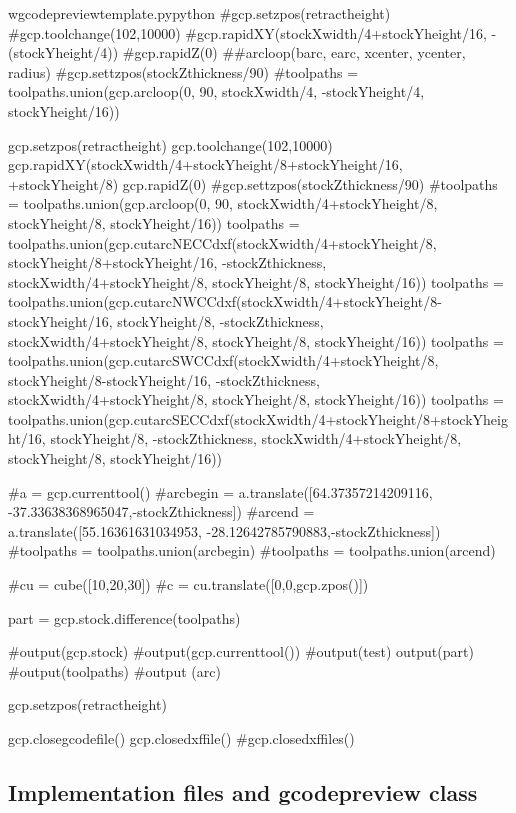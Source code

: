 \documentclass{ltxdoc}
\begin{document}
\begin{writecode}{w}{gcodepreviewtemplate.py}{python}
#gcp.setzpos(retractheight)
#gcp.toolchange(102,10000)
#gcp.rapidXY(stockXwidth/4+stockYheight/16, -(stockYheight/4))
#gcp.rapidZ(0)
##arcloop(barc, earc, xcenter, ycenter, radius)
#gcp.settzpos(stockZthickness/90)
#toolpaths = toolpaths.union(gcp.arcloop(0, 90, stockXwidth/4, -stockYheight/4, stockYheight/16))

gcp.setzpos(retractheight)
gcp.toolchange(102,10000)
gcp.rapidXY(stockXwidth/4+stockYheight/8+stockYheight/16, +stockYheight/8)
gcp.rapidZ(0)
#gcp.settzpos(stockZthickness/90)
#toolpaths = toolpaths.union(gcp.arcloop(0, 90, stockXwidth/4+stockYheight/8, stockYheight/8, stockYheight/16))
toolpaths = toolpaths.union(gcp.cutarcNECCdxf(stockXwidth/4+stockYheight/8, stockYheight/8+stockYheight/16, -stockZthickness, stockXwidth/4+stockYheight/8, stockYheight/8, stockYheight/16))
toolpaths = toolpaths.union(gcp.cutarcNWCCdxf(stockXwidth/4+stockYheight/8-stockYheight/16, stockYheight/8, -stockZthickness, stockXwidth/4+stockYheight/8, stockYheight/8, stockYheight/16))
toolpaths = toolpaths.union(gcp.cutarcSWCCdxf(stockXwidth/4+stockYheight/8, stockYheight/8-stockYheight/16, -stockZthickness, stockXwidth/4+stockYheight/8, stockYheight/8, stockYheight/16))
toolpaths = toolpaths.union(gcp.cutarcSECCdxf(stockXwidth/4+stockYheight/8+stockYheight/16, stockYheight/8, -stockZthickness, stockXwidth/4+stockYheight/8, stockYheight/8, stockYheight/16))

#a = gcp.currenttool()
#arcbegin = a.translate([64.37357214209116, -37.33638368965047,-stockZthickness])
#arcend = a.translate([55.16361631034953, -28.12642785790883,-stockZthickness])
#toolpaths = toolpaths.union(arcbegin)
#toolpaths = toolpaths.union(arcend)

#cu = cube([10,20,30])
#c = cu.translate([0,0,gcp.zpos()])

part = gcp.stock.difference(toolpaths)

#output(gcp.stock)
#output(gcp.currenttool())
#output(test)
output(part)
#output(toolpaths)
#output (arc)

gcp.setzpos(retractheight)

gcp.closegcodefile()
gcp.closedxffile()
#gcp.closedxffiles()

\end{writecode}
\addtocounter{gcptmplpy}{201}

\subsection{Implementation files and gcodepreview class}
 
\end{document}
